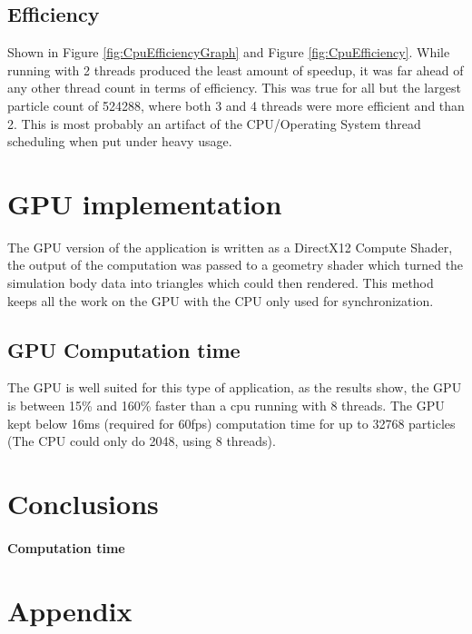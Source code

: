 \documentclass[conference]{acmsiggraph}
\begin{document}
\subsection{Efficiency}
Shown in Figure \ref{fig:CpuEfficiencyGraph} and Figure \ref{fig:CpuEfficiency}.
While running with 2 threads produced the least amount of speedup, it was far ahead of any other thread count in terms of efficiency. This was true for all but the largest particle count of 524288, where both 3 and 4 threads were more efficient and than 2. This is most probably an artifact of the CPU/Operating System thread scheduling when put under heavy usage.

\section{GPU implementation}
The GPU version of the application is written as a DirectX12 Compute Shader, the output of the computation was passed to a geometry shader which turned the simulation body data into triangles which could then rendered. This method keeps all the work on the GPU with the CPU only used for synchronization. 

\subsection{GPU Computation time}
The GPU is well suited for this type of application, as the results show, the GPU is between 15\% and 160\% faster than a cpu running with 8 threads. The GPU kept below 16ms (required for 60fps) computation time for up to 32768 particles (The CPU could only do 2048, using 8 threads).

\section{Conclusions}
\paragraph{Computation time}




\newpage
\section{Appendix}
\end{document}
